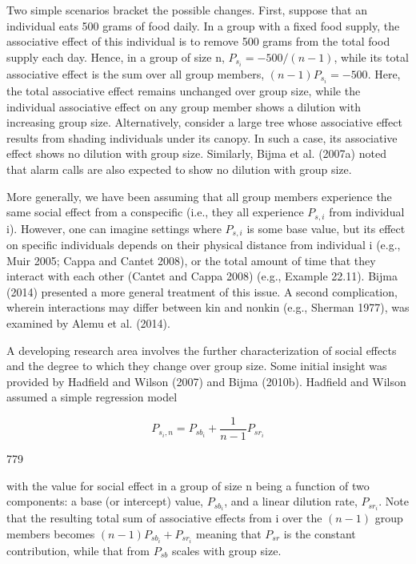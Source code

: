 \documentclass{article}
\begin{document}
Two simple scenarios bracket the possible changes. First, suppose that an individual eats 500 grams of food daily. In a group with a fixed food supply, the associative effect of this individual is to remove 500 grams from the total food supply each day. Hence, in a group of size n,  $ P_{s_i} = -500/(n - 1) $, while its total associative effect is the sum over all group members,  $ (n - 1)P_{s_i} = -500 $. Here, the total associative effect remains unchanged over group size, while the individual associative effect on any group member shows a dilution with increasing group size. Alternatively, consider a large tree whose associative effect results from shading individuals under its canopy. In such a case, its associative effect shows no dilution with group size. Similarly, Bijma et al. (2007a) noted that alarm calls are also expected to show no dilution with group size.

More generally, we have been assuming that all group members experience the same social effect from a conspecific (i.e., they all experience  $ P_{s,i} $ from individual i). However, one can imagine settings where  $ P_{s,i} $ is some base value, but its effect on specific individuals depends on their physical distance from individual i (e.g., Muir 2005; Cappa and Cantet 2008), or the total amount of time that they interact with each other (Cantet and Cappa 2008) (e.g., Example 22.11). Bijma (2014) presented a more general treatment of this issue. A second complication, wherein interactions may differ between kin and nonkin (e.g., Sherman 1977), was examined by Alemu et al. (2014).

A developing research area involves the further characterization of social effects and the degree to which they change over group size. Some initial insight was provided by Hadfield and Wilson (2007) and Bijma (2010b). Hadfield and Wilson assumed a simple regression model

\begin{equation}
P_{s_{i},n}=P_{s b_{i}}+\frac{1}{n-1}P_{s r_{i}}
\tag{22.9}
\label{eq:22_9}
\end{equation}

779

with the value for social effect in a group of size n being a function of two components: a base (or intercept) value,  $ P_{sb_i} $, and a linear dilution rate,  $ P_{sr_i} $. Note that the resulting total sum of associative effects from i over the  $ (n-1) $ group members becomes  $ (n-1)P_{sb_i} + P_{sr_i} $ meaning that  $ P_{sr} $ is the constant contribution, while that from  $ P_{sb} $ scales with group size.
\end{document}
